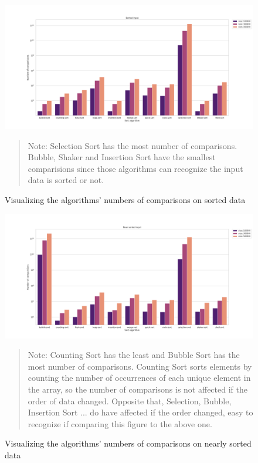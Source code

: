 \documentclass[11pt,a4paper]{article}
\newenvironment{fignote}{\begin{quote}\footnotesize}{\end{quote}}
\begin{document}
\begin{figure}[H]
  \includegraphics[width = 16cm]{plot/sorted_bar.png}
  \centering
  \begin{fignote} 
    Note: Selection Sort has the most number of comparisons. Bubble, Shaker and Insertion Sort have the smallest comparisions
    since those algorithms can recognize the input data is sorted or not.
  \end{fignote}
  \caption{Visualizing the algorithms' numbers of comparisons on sorted data}
\end{figure}

\begin{figure}[H]
  \includegraphics[width = 16cm]{plot/nsorted_bar.png}
  \centering
  \begin{fignote} 
    Note: Counting Sort has the least and Bubble Sort has the most number of comparisons.
    Counting Sort sorts elements by counting the number of occurrences of each unique element in the array, so the 
    number of comparisons is not affected if the order of data changed.
    Opposite that, Selection, Bubble, Insertion Sort ... do have affected if the order changed, 
    easy to recognize if comparing this figure to the above one.
  \end{fignote}
  \caption{Visualizing the algorithms' numbers of comparisons on nearly sorted data}
\end{figure}
\end{document}
